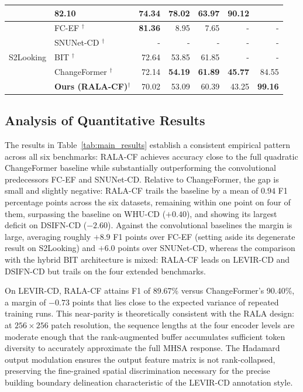 \begin{table}[htbp]
{\begin{tabularx}{\textwidth}{|l|X|r|r|r|r|r|}
        & \textbf{82.10} & 74.34 & 78.02 & 63.97 & 90.12 \\
\hline
\multirow{5}{*}{S2Looking}
    & FC-EF \cite{Daudt2018SiamICIP}$^\dagger$
        & \textbf{81.36} & 8.95 & 7.65 & - & - \\ \cline{2-7}
    & SNUNet-CD \cite{Fang2021SNUNetCD}$^\dagger$
        & - & - & - & - & - \\ \cline{2-7}
    & BIT \cite{Chen2022BIT}$^\dagger$
        & 72.64 & 53.85 & 61.85 & - & - \\ \cline{2-7}
    & ChangeFormer \cite{Bandara2022ChangeFormer}$^\dagger$
        & 72.14 & \textbf{54.19} & \textbf{61.89} & \textbf{45.77} & 84.55 \\ \cline{2-7}
\rowcolor{pastelorange}
    & \textbf{Ours (RALA-CF)}$^\dagger$
        & 70.02 & 53.09 & 60.39 & 43.25 & \textbf{99.16} \\
\hline
\end{tabularx}
}
\end{table}

\subsection{Analysis of Quantitative Results}

The results in Table~\ref{tab:main_results} establish a consistent empirical pattern across all six benchmarks: \ac{RALA-CF} achieves accuracy close to the full quadratic ChangeFormer baseline while substantially outperforming the convolutional predecessors FC-EF and SNUNet-CD. Relative to ChangeFormer, the gap is small and slightly negative: \ac{RALA-CF} trails the baseline by a mean of $0.94$ F1 percentage points across the six datasets, remaining within one point on four of them, surpassing the baseline on WHU-CD ($+0.40$), and showing its largest deficit on DSIFN-CD ($-2.60$). Against the convolutional baselines the margin is large, averaging roughly $+8.9$ F1 points over FC-EF (setting aside its degenerate result on S2Looking) and $+6.0$ points over SNUNet-CD, whereas the comparison with the hybrid BIT architecture is mixed: \ac{RALA-CF} leads on LEVIR-CD and DSIFN-CD but trails on the four extended benchmarks.

On LEVIR-CD, \ac{RALA-CF} attains F1 of 89.67\% versus ChangeFormer's 90.40\%, a margin of $-0.73$ points that lies close to the expected variance of repeated training runs. This near-parity is theoretically consistent with the \ac{RALA} design: at $256 \times 256$ patch resolution, the sequence lengths at the four encoder levels are moderate enough that the rank-augmented buffer accumulates sufficient token diversity to accurately approximate the full \ac{MHSA} response. The Hadamard output modulation ensures the output feature matrix is not rank-collapsed, preserving the fine-grained spatial discrimination necessary for the precise building boundary delineation characteristic of the LEVIR-CD annotation style.

